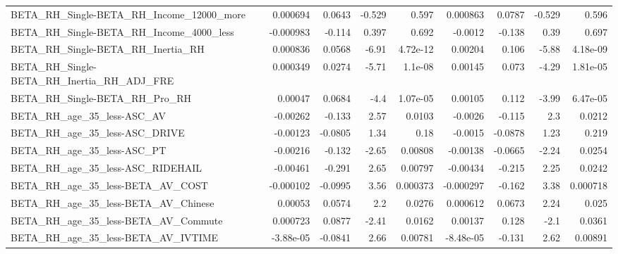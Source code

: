 \begin{tabular}{lrrrrrrrr}
BETA\_RH\_Single-BETA\_RH\_Income\_12000\_more           &    0.000694 &       0.0643 &   -0.529 &    0.597 &   0.000863 &      0.0787 &       -0.529 &         0.596 \\
BETA\_RH\_Single-BETA\_RH\_Income\_4000\_less            &   -0.000983 &       -0.114 &    0.397 &    0.692 &    -0.0012 &      -0.138 &         0.39 &         0.697 \\
BETA\_RH\_Single-BETA\_RH\_Inertia\_RH                  &    0.000836 &       0.0568 &    -6.91 & 4.72e-12 &    0.00204 &       0.106 &        -5.88 &      4.18e-09 \\
BETA\_RH\_Single-BETA\_RH\_Inertia\_RH\_ADJ\_FRE          &    0.000349 &       0.0274 &    -5.71 &  1.1e-08 &    0.00145 &       0.073 &        -4.29 &      1.81e-05 \\
BETA\_RH\_Single-BETA\_RH\_Pro\_RH                      &     0.00047 &       0.0684 &     -4.4 & 1.07e-05 &    0.00105 &       0.112 &        -3.99 &      6.47e-05 \\
BETA\_RH\_age\_35\_less-ASC\_AV                         &    -0.00262 &       -0.133 &     2.57 &   0.0103 &    -0.0026 &      -0.115 &          2.3 &        0.0212 \\
BETA\_RH\_age\_35\_less-ASC\_DRIVE                      &    -0.00123 &      -0.0805 &     1.34 &     0.18 &    -0.0015 &     -0.0878 &         1.23 &         0.219 \\
BETA\_RH\_age\_35\_less-ASC\_PT                         &    -0.00216 &       -0.132 &    -2.65 &  0.00808 &   -0.00138 &     -0.0665 &        -2.24 &        0.0254 \\
BETA\_RH\_age\_35\_less-ASC\_RIDEHAIL                   &    -0.00461 &       -0.291 &     2.65 &  0.00797 &   -0.00434 &      -0.215 &         2.25 &        0.0242 \\
BETA\_RH\_age\_35\_less-BETA\_AV\_COST                   &   -0.000102 &      -0.0995 &     3.56 & 0.000373 &  -0.000297 &      -0.162 &         3.38 &      0.000718 \\
BETA\_RH\_age\_35\_less-BETA\_AV\_Chinese                &     0.00053 &       0.0574 &      2.2 &   0.0276 &   0.000612 &      0.0673 &         2.24 &         0.025 \\
BETA\_RH\_age\_35\_less-BETA\_AV\_Commute                &    0.000723 &       0.0877 &    -2.41 &   0.0162 &    0.00137 &       0.128 &         -2.1 &        0.0361 \\
BETA\_RH\_age\_35\_less-BETA\_AV\_IVTIME                 &   -3.88e-05 &      -0.0841 &     2.66 &  0.00781 &  -8.48e-05 &      -0.131 &         2.62 &       0.00891 \\

\end{tabular}
